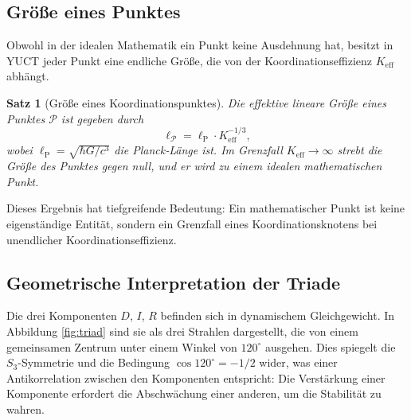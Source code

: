 \documentclass[12pt,a4paper]{article}
\newtheorem{satz}{Satz}
\newcommand{\Keff}{K_{\mathrm{eff}}}
\newcommand{\calP}{\mathcal{P}}
\newcommand{\ellP}{\ell_{\mathrm{P}}}
\begin{document}
	\subsection{Größe eines Punktes}
	
	Obwohl in der idealen Mathematik ein Punkt keine Ausdehnung hat, besitzt in YUCT jeder Punkt eine endliche Größe, die von der Koordinationseffizienz \(\Keff\) abhängt.
	
	\begin{satz}[Größe eines Koordinationspunktes]
		Die effektive lineare Größe eines Punktes \(\calP\) ist gegeben durch
		\[
		\ell_{\calP} = \ellP \cdot \Keff^{-1/3},
		\]
		wobei \(\ellP = \sqrt{\hbar G / c^3}\) die Planck‑Länge ist.
		Im Grenzfall \(\Keff \to \infty\) strebt die Größe des Punktes gegen null, und er wird zu einem idealen mathematischen Punkt.
	\end{satz}
	
	Dieses Ergebnis hat tiefgreifende Bedeutung: Ein mathematischer Punkt ist keine eigenständige Entität, sondern ein Grenzfall eines Koordinationsknotens bei unendlicher Koordinationseffizienz.
	
	\subsection{Geometrische Interpretation der Triade}
	
	Die drei Komponenten \(D\), \(I\), \(R\) befinden sich in dynamischem Gleichgewicht. In Abbildung \ref{fig:triad} sind sie als drei Strahlen dargestellt, die von einem gemeinsamen Zentrum unter einem Winkel von \(120^\circ\) ausgehen. Dies spiegelt die \(S_3\)-Symmetrie und die Bedingung \(\cos 120^\circ = -1/2\) wider, was einer Antikorrelation zwischen den Komponenten entspricht: Die Verstärkung einer Komponente erfordert die Abschwächung einer anderen, um die Stabilität zu wahren.
	
\end{document}
